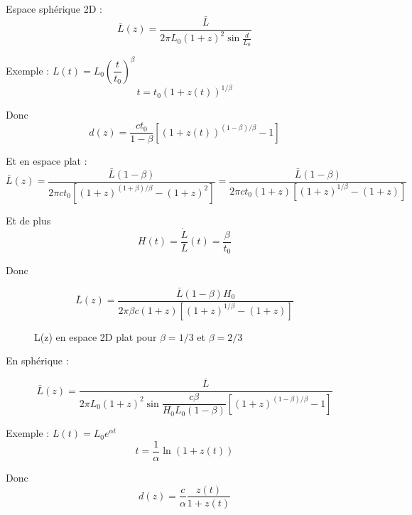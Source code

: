 \documentclass[11pt]{article} %
\begin{document}
Espace sphérique 2D : 
\begin{equation}
\bar{L} (z) = \dfrac{\bar{L}}{2\pi L_0(1+z)^2 \sin\frac{d}{L_0}}
\end{equation}

Exemple : $L(t) = L_0 \left (\dfrac{t}{t_0} \right )  ^\beta$
\begin{equation}
t = t_0 \left (1+z(t) \right)^{1/\beta}
\end{equation}

Donc
\begin{equation}
d(z) = \dfrac{ct_0} {1-\beta} \left [ \left (1+z(t) \right)^{(1-\beta)/\beta} - 1 \right ]
\end{equation}

Et en espace plat :
\begin{equation}
\bar{L} (z) = \dfrac{\bar{L}(1-\beta)}{2\pi ct_0 \left [ (1+z)^{(1+\beta)/\beta}- (1+z)^2 \right ] } = \dfrac{\bar{L}(1-\beta)}{2\pi ct_0 \left(1+z \right ) \left [ (1+z)^{1/\beta}- (1+z) \right ] }
\end{equation}

Et de plus 
\begin{equation}
H(t) = \dfrac{\dot{L}}{L}(t) = \dfrac{\beta}{t_0}
\end{equation}

Donc 


\begin{equation}
\bar{L} (z) = \dfrac{\bar{L}(1-\beta)H_0}{2\pi \beta c\left(1+z \right ) \left [ (1+z)^{1/\beta}- (1+z) \right ] }
\end{equation}


\begin{figure}[H]
\centering
  \caption{L(z) en espace 2D plat pour $\beta = 1/3$ et $\beta = 2/3$}

\end{figure}


En sphérique :

\begin{equation}
\bar{L} (z) = \dfrac{\bar{L}}{2\pi L_0 (1+z)^2 \sin\dfrac{c\beta} {H_0 L_0(1-\beta)} \left [ \left (1+z \right)^{(1-\beta)/\beta} - 1 \right ]}
\end{equation}

Exemple : $L(t) = L_0 e^{\alpha t}$
\begin{equation}
t = \dfrac{1}{\alpha} \ln {\left (1+z(t) \right )}
\end{equation}

Donc
\begin{equation}
d(z) = \dfrac{c}{\alpha} \dfrac{z(t)}{1+z(t)}
\end{equation}
\end{document}
